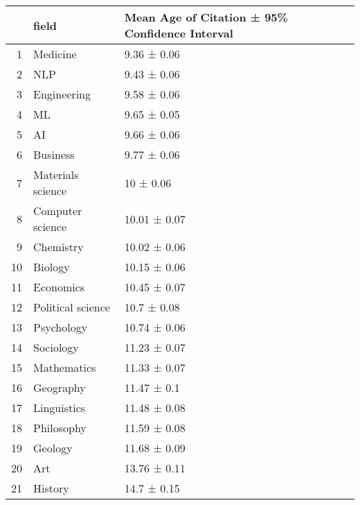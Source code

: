 \begin{table}[ht]
\centering
\begin{tabular}{rll}
  \hline
 & field & Mean Age of Citation ± 95\% Confidence Interval \\ 
  \hline
1 & Medicine & 9.36 ± 0.06 \\ 
  2 & NLP & 9.43 ± 0.06 \\ 
  3 & Engineering & 9.58 ± 0.06 \\ 
  4 & ML & 9.65 ± 0.05 \\ 
  5 & AI & 9.66 ± 0.06 \\ 
  6 & Business & 9.77 ± 0.06 \\ 
  7 & Materials science & 10 ± 0.06 \\ 
  8 & Computer science & 10.01 ± 0.07 \\ 
  9 & Chemistry & 10.02 ± 0.06 \\ 
  10 & Biology & 10.15 ± 0.06 \\ 
  11 & Economics & 10.45 ± 0.07 \\ 
  12 & Political science & 10.7 ± 0.08 \\ 
  13 & Psychology & 10.74 ± 0.06 \\ 
  14 & Sociology & 11.23 ± 0.07 \\ 
  15 & Mathematics & 11.33 ± 0.07 \\ 
  16 & Geography & 11.47 ± 0.1 \\ 
  17 & Linguistics & 11.48 ± 0.08 \\ 
  18 & Philosophy & 11.59 ± 0.08 \\ 
  19 & Geology & 11.68 ± 0.09 \\ 
  20 & Art & 13.76 ± 0.11 \\ 
  21 & History & 14.7 ± 0.15 \\ 
   \hline
\end{tabular}
\end{table}
